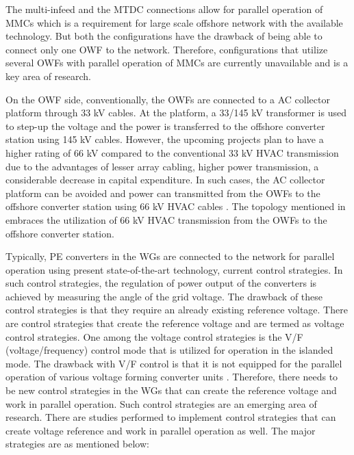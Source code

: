 The multi-infeed and the MTDC connections allow for parallel operation of \gls{MMC}s which is a requirement for large scale offshore network with the available technology. But both the configurations have the drawback of being able to connect only one \gls{OWF} to the network. Therefore, configurations that utilize several \gls{OWF}s with parallel operation of \gls{MMC}s are currently unavailable and is a key area of research.


On the \gls{OWF} side, conventionally, the \gls{OWF}s are connected to a \gls{AC} collector platform through 33 kV cables. At the platform, a 33/145 kV transformer is used to step-up the voltage and the power is transferred to the offshore converter station using 145 kV cables. However, the upcoming projects plan to have a higher rating of 66 kV compared to the conventional 33 kV \gls{HVAC} transmission due to the advantages of lesser array cabling, higher power transmission, a considerable decrease in capital expenditure. In such cases, the \gls{AC} collector platform can be avoided and power can transmitted from the \gls{OWF}s to the offshore converter station using 66 kV \gls{HVAC} cables \cite{dnv66kv}. The topology mentioned in \cite{lozada_ayala_dynamic_2018} embraces the utilization of 66 kV \gls{HVAC} transmission from the \gls{OWF}s to the offshore converter station.

Typically, \gls{PE} converters in the \gls{WG}s are connected to the network for parallel operation using present state-of-the-art technology, current control strategies. In such control strategies, the regulation of power output of the converters is achieved by measuring the angle of the grid voltage. The drawback of these control strategies is that they require an already existing reference voltage. There are control strategies that create the reference voltage and are termed as voltage control strategies. One among the voltage control strategies is the V/F (voltage/frequency) control mode that is utilized for operation in the islanded mode. The drawback with V/F control is that it is not equipped for the parallel operation of various voltage forming converter units \cite{weise2019comparison}. Therefore, there needs to be new control strategies in the \gls{WG}s that can create the reference voltage and work in parallel operation. Such control strategies are an emerging area of research. 
There are studies performed to implement control strategies that can create voltage reference and work in parallel operation as well. The major strategies are as mentioned below:

